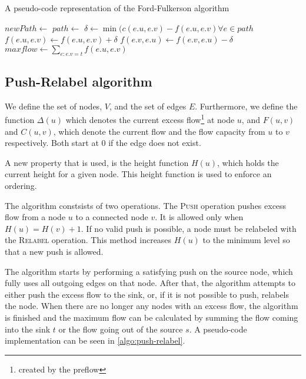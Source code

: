 \begin{algorithm}
\caption{A pseudo-code representation of the Ford-Fulkerson algorithm}
\label{algo:ford-fulkerson}
\begin{algorithmic}

		\State {}
	\Else
			\State $newPath \gets$ 
				\State {}
			\EndIf
		\EndFor
		\State \Return{$\emptyset$}
	\EndIf
\EndFunction
\State
{}
	\State $path \gets$ 
	\State $\delta \gets \min(c(e.u, e.v) - f(e.u, e.v) \forall e \in path$
		\State $f(e.u, e.v) \gets f(e.u, e.v) + \delta$
		\State $f(e.v, e.u) \gets f(e.v, e.u) - \delta$
	\EndFor
\EndWhile
\State $maxflow \gets \sum\limits_{e : e.v = t} f(e.u, e.v)$

\end{algorithmic}
\end{algorithm}

\subsection{Push-Relabel algorithm}
\label{subsect:pushrelabel}

We define the set of nodes, $V$, and the set of edges $E$. Furthermore, we define the function $\Delta(u)$ which denotes the current excess flow\footnote{created by the preflow} at node $u$, and $F(u, v)$ and $C(u, v)$, which denote the current flow and the flow capacity from $u$ to $v$ respectively. Both start at $0$ if the edge does not exist.

A new property that is used, is the height function $H(u)$, which holds the current height for a given node. This height function is used to enforce an ordering.

The algorithm constsists of two operations. The \textsc{Push} operation pushes excess flow from a node $u$ to a connected node $v$. It is allowed only when $H(u) = H(v) + 1$. If no valid push is possible, a node must be relabeled with the \textsc{Relabel} operation. This method increases $H(u)$ to the minimum level so that a new push is allowed.

The algorithm starts by performing a satisfying push on the source node, which fully uses all outgoing edges on that node. After that, the algorithm attempts to either push the excess flow to the sink, or, if it is not possible to push, relabels the node. When there are no longer any nodes with an excess flow, the algorithm is finished and the maximum flow can be calculated by summing the flow coming into the sink $t$ or the flow going out of the source $s$. A pseudo-code implementation can be seen in \autoref{algo:push-relabel}.

